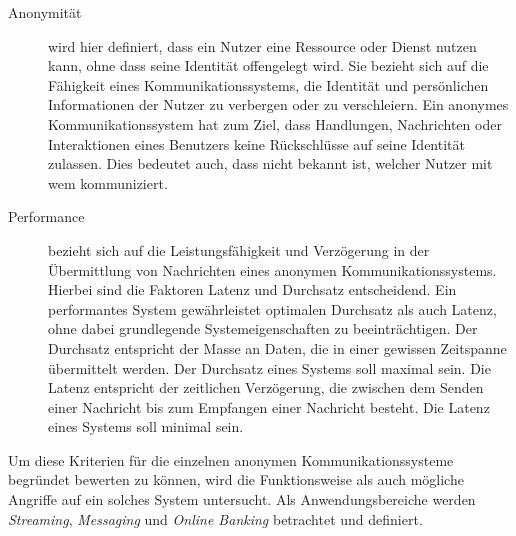 \begin{description}
    \item[Anonymität] wird hier definiert, dass ein Nutzer eine Ressource oder Dienst nutzen kann, ohne dass seine Identität offengelegt wird. Sie bezieht sich auf die Fähigkeit eines Kommunikationssystems, die Identität und persönlichen Informationen der Nutzer zu verbergen oder zu verschleiern. Ein anonymes Kommunikationssystem hat zum Ziel, dass Handlungen, Nachrichten oder Interaktionen eines Benutzers keine Rückschlüsse auf seine Identität zulassen. Dies bedeutet auch, dass nicht bekannt ist, welcher Nutzer mit wem kommuniziert\cite{DefinitionOfAnonymity}.

    \item[Performance] bezieht sich auf die Leistungsfähigkeit und Verzögerung in der Übermittlung von Nachrichten eines anonymen Kommunikationssystems. Hierbei sind die Faktoren Latenz und Durchsatz entscheidend. Ein performantes System gewährleistet optimalen Durchsatz als auch Latenz, ohne dabei grundlegende Systemeigenschaften zu beeinträchtigen. Der Durchsatz entspricht der Masse an Daten, die in einer gewissen Zeitspanne übermittelt werden. Der Durchsatz eines Systems soll maximal sein. Die Latenz entspricht der zeitlichen Verzögerung, die zwischen dem Senden einer Nachricht bis zum Empfangen einer Nachricht besteht. Die Latenz eines Systems soll minimal sein\cite{ComputerNetworkPerformanceAnalysis}.
\end{description}

Um diese Kriterien für die einzelnen anonymen Kommunikationssysteme begründet bewerten zu können, wird die Funktionsweise als auch mögliche Angriffe auf ein solches System untersucht. Als Anwendungsbereiche werden \textit{Streaming}, \textit{Messaging} und \textit{Online Banking} betrachtet und definiert.